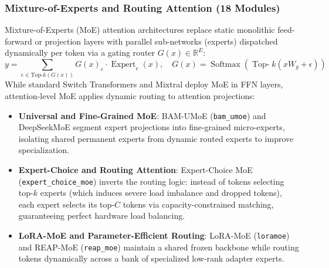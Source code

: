 \documentclass{article}
\begin{document}
\subsubsection{Mixture-of-Experts and Routing Attention (18 Modules)}
Mixture-of-Experts (MoE) attention architectures replace static monolithic feed-forward or projection layers with parallel sub-networks (experts) dispatched dynamically per token via a gating router $G(x) \in \mathbb{R}^E$:
\begin{equation}
    y = \sum_{e \in \text{Top-}k(G(x))} G(x)_e \cdot \operatorname{Expert}_e(x), \quad G(x) = \operatorname{Softmax}(\operatorname{Top-}k(x W_g + \epsilon))
\end{equation}
While standard Switch Transformers \citep{fedus2022switch} and Mixtral \citep{jiang2024mixtral} deploy MoE in FFN layers, attention-level MoE applies dynamic routing to attention projections:
\begin{itemize}
    \item \textbf{Universal and Fine-Grained MoE}: BAM-UMoE (\texttt{bam\_umoe}) \citep{bam_umoe_2025} and DeepSeekMoE \citep{deepseek2024deepseekmoe} segment expert projections into fine-grained micro-experts, isolating shared permanent experts from dynamic routed experts to improve specialization.
    \item \textbf{Expert-Choice and Routing Attention}: Expert-Choice MoE (\texttt{expert\_choice\_moe}) \citep{expert_choice_moe_2022} inverts the routing logic: instead of tokens selecting top-$k$ experts (which induces severe load imbalance and dropped tokens), each expert selects its top-$C$ tokens via capacity-constrained matching, guaranteeing perfect hardware load balancing.
    \item \textbf{LoRA-MoE and Parameter-Efficient Routing}: LoRA-MoE (\texttt{loramoe}) \citep{zhang2023loramoe} and REAP-MoE (\texttt{reap\_moe}) maintain a shared frozen backbone while routing tokens dynamically across a bank of specialized low-rank adapter experts.
\end{itemize}
\end{document}
